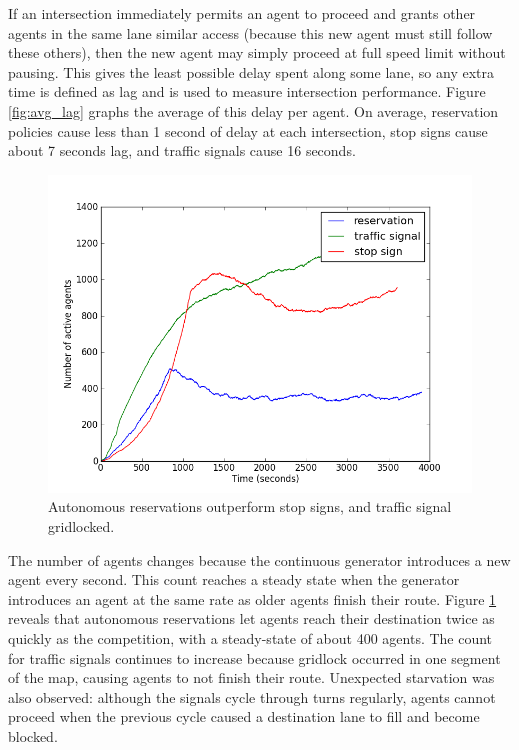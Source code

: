 \documentclass[letterpaper, 10 pt, conference]{ieeeconf}  %
\begin{document}
If an intersection immediately permits an agent to proceed and grants other
agents in the same lane similar access (because this new agent must still follow
these others), then the new agent may simply proceed at full speed limit without
pausing. This gives the least possible delay spent along some lane, so any extra
time is defined as lag and is used to measure intersection performance. Figure
\ref{fig:avg_lag} graphs the average of this delay per agent. On average,
reservation policies cause less than 1 second of delay at each intersection,
stop signs cause about 7 seconds lag, and traffic signals cause 16 seconds.

\begin{figure}[h]
  \centering \includegraphics[width=\linewidth]{agent_cnt_atx.png}
  \caption{Autonomous reservations outperform stop signs, and traffic signal
           gridlocked.}
  \label{fig:agent_cnt}
  \vspace{-10pt}
\end{figure}

The number of agents changes because the continuous generator introduces a new
agent every second. This count reaches a steady state when the generator
introduces an agent at the same rate as older agents finish their route. Figure
\ref{fig:agent_cnt} reveals that autonomous reservations let agents reach their
destination twice as quickly as the competition, with a steady-state of about
400 agents. The count for traffic signals continues to increase because gridlock
occurred in one segment of the map, causing agents to not finish their route.
Unexpected starvation was also observed: although the signals cycle through
turns regularly, agents cannot proceed when the previous cycle caused a
destination lane to fill and become blocked.
\end{document}

